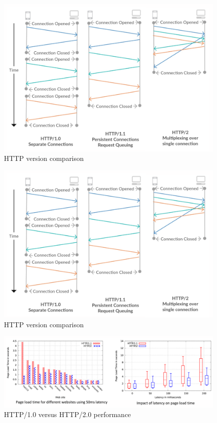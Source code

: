 \documentclass[a4paper,11pt]{article}
\begin{document}
\begin{figure}[H]
    \centering
    \includegraphics[width=\textwidth]{./images/httpversioncomparison.png}
    \caption{HTTP version comparison}
\end{figure}

\begin{figure}[H]
    \centering
    \includegraphics[width=\textwidth]{./images/httpversioncomparison.png}
    \caption{HTTP version comparison}
\end{figure}

\begin{figure}[H]
    \centering
    \includegraphics[width=\textwidth]{./images/http1vshttp2.png}
    \caption{HTTP/1.0 versus HTTP/2.0 performance}
\end{figure}
\end{document}
